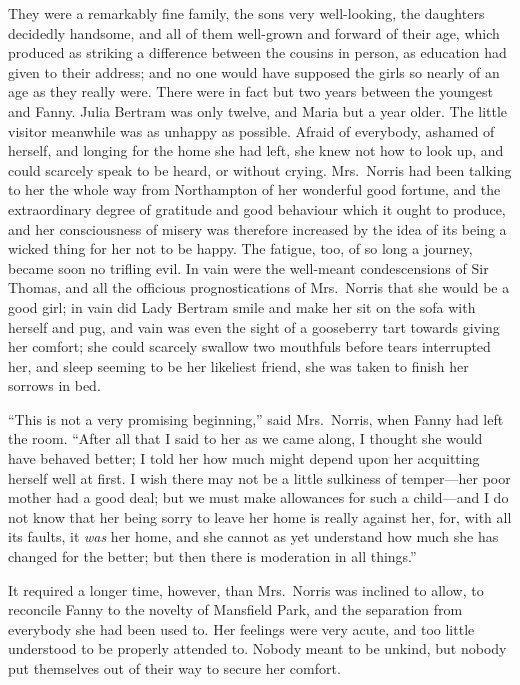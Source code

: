 They were a remarkably fine family, the sons very well-looking,
the daughters decidedly handsome, and all of them well-grown
and forward of their age, which produced as striking
a difference between the cousins in person, as education
had given to their address; and no one would have supposed
the girls so nearly of an age as they really were.  There were
in fact but two years between the youngest and Fanny.
Julia Bertram was only twelve, and Maria but a year older.
The little visitor meanwhile was as unhappy as possible.
Afraid of everybody, ashamed of herself, and longing
for the home she had left, she knew not how to look up,
and could scarcely speak to be heard, or without crying.
Mrs.\ Norris had been talking to her the whole way from
Northampton of her wonderful good fortune, and the
extraordinary degree of gratitude and good behaviour
which it ought to produce, and her consciousness of
misery was therefore increased by the idea of its being
a wicked thing for her not to be happy.  The fatigue,
too, of so long a journey, became soon no trifling evil.
In vain were the well-meant condescensions of Sir Thomas,
and all the officious prognostications of Mrs.\ Norris
that she would be a good girl; in vain did Lady Bertram
smile and make her sit on the sofa with herself and pug,
and vain was even the sight of a gooseberry tart towards
giving her comfort; she could scarcely swallow two mouthfuls
before tears interrupted her, and sleep seeming to be her
likeliest friend, she was taken to finish her sorrows in bed.

``This is not a very promising beginning,'' said Mrs.\ Norris,
when Fanny had left the room.  ``After all that I said to her
as we came along, I thought she would have behaved better;
I told her how much might depend upon her acquitting
herself well at first.  I wish there may not be a little
sulkiness of temper---her poor mother had a good deal;
but we must make allowances for such a child---and I
do not know that her being sorry to leave her home is
really against her, for, with all its faults, it \emph{was}
her home, and she cannot as yet understand how much she
has changed for the better; but then there is moderation
in all things.''

It required a longer time, however, than Mrs.\ Norris
was inclined to allow, to reconcile Fanny to the novelty
of Mansfield Park, and the separation from everybody
she had been used to.  Her feelings were very acute,
and too little understood to be properly attended to.
Nobody meant to be unkind, but nobody put themselves out
of their way to secure her comfort.

